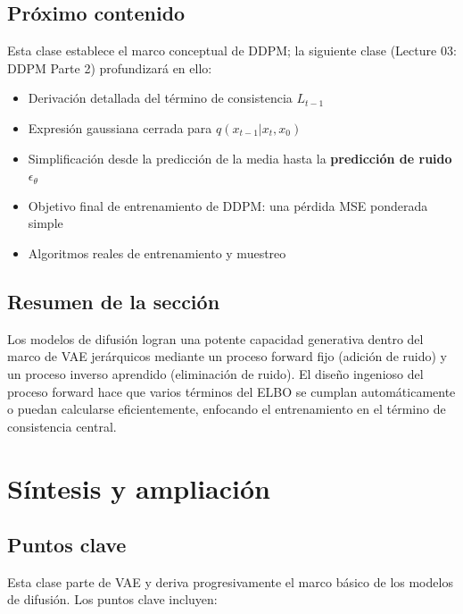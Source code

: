 \documentclass[a4paper]{article}
\begin{document}
\subsection{Próximo contenido}

Esta clase establece el marco conceptual de DDPM; la siguiente clase (Lecture 03: DDPM Parte 2) profundizará en ello:

\begin{itemize}
    \item Derivación detallada del término de consistencia $L_{t-1}$
    \item Expresión gaussiana cerrada para $q(x_{t-1}|x_t, x_0)$
    \item Simplificación desde la predicción de la media hasta la \textbf{predicción de ruido} $\epsilon_\theta$
    \item Objetivo final de entrenamiento de DDPM: una pérdida MSE ponderada simple
    \item Algoritmos reales de entrenamiento y muestreo
\end{itemize}

\subsection{Resumen de la sección}

Los modelos de difusión logran una potente capacidad generativa dentro del marco de VAE jerárquicos mediante un proceso forward fijo (adición de ruido) y un proceso inverso aprendido (eliminación de ruido). El diseño ingenioso del proceso forward hace que varios términos del ELBO se cumplan automáticamente o puedan calcularse eficientemente, enfocando el entrenamiento en el término de consistencia central.
\section{Síntesis y ampliación}

\subsection{Puntos clave}

Esta clase parte de VAE y deriva progresivamente el marco básico de los modelos de difusión. Los puntos clave incluyen:
\end{document}

